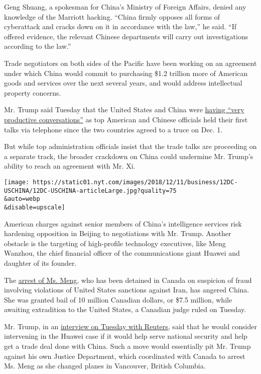 Geng Shuang, a spokesman for China's Ministry of Foreign Affairs, denied
any knowledge of the Marriott hacking. ``China firmly opposes all forms
of cyberattack and cracks down on it in accordance with the law,'' he
said. ``If offered evidence, the relevant Chinese departments will carry
out investigations according to the law.''

Trade negotiators on both sides of the Pacific have been working on an
agreement under which China would commit to purchasing \$1.2 trillion
more of American goods and services over the next several years, and
would address intellectual property concerns.

Mr. Trump said Tuesday that the United States and China were
\href{https://twitter.com/realDonaldTrump/status/1072480983683870720}{having
``very productive conversations''} as top American and Chinese officials
held their first talks via telephone since the two countries agreed to a
truce on Dec. 1.

But while top administration officials insist that the trade talks are
proceeding on a separate track, the broader crackdown on China could
undermine Mr. Trump's ability to reach an agreement with Mr. Xi.

\texttt{[image: https://static01.nyt.com/images/2018/12/11/business/12DC-USCHINA/12DC-USCHINA-articleLarge.jpg?quality=75\\\&auto=webp\\\&disable=upscale]}

American charges against senior members of China's intelligence services
risk hardening opposition in Beijing to negotiations with Mr. Trump.
Another obstacle is the targeting of high-profile technology executives,
like Meng Wanzhou, the chief financial officer of the communications
giant Huawei and daughter of its founder.

The
\href{https://www.nytimes.com/2018/12/07/technology/meng-wanzhou-huawei-arrest.html}{arrest
of Ms. Meng}, who has been detained in Canada on suspicion of fraud
involving violations of United States sanctions against Iran, has
angered China. She was granted bail of 10 million Canadian dollars, or
\$7.5 million, while awaiting extradition to the United States, a
Canadian judge ruled on Tuesday.

Mr. Trump, in an
\href{https://www.reuters.com/article/us-usa-trump-huawei-tech-exclusive/exclusive-trump-says-he-could-intervene-in-u-s-case-against-huawei-cfo-idUSKBN1OA2PQ}{interview
on Tuesday with Reuters}, said that he would consider intervening in the
Huawei case if it would help serve national security and help get a
trade deal done with China. Such a move would essentially pit Mr. Trump
against his own Justice Department, which coordinated with Canada to
arrest Ms. Meng as she changed planes in Vancouver, British Columbia.

